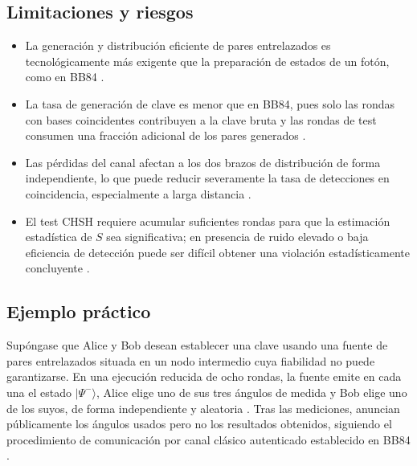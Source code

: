 \subsection{Limitaciones y riesgos}
\begin{itemize}
    \item La generación y distribución eficiente de pares entrelazados es tecnológicamente más exigente que la preparación de estados de un fotón, como en BB84 \citep{bennett1984,gisin2002}.
    \item La tasa de generación de clave es menor que en BB84, pues solo las rondas con bases coincidentes contribuyen a la clave bruta y las rondas de test consumen una fracción adicional de los pares generados \citep{ekert1991,scarani2009}.
    \item Las pérdidas del canal afectan a los dos brazos de distribución de forma independiente, lo que puede reducir severamente la tasa de detecciones en coincidencia, especialmente a larga distancia \citep{gisin2002,lo2014}.
    \item El test CHSH requiere acumular suficientes rondas para que la estimación estadística de $S$ sea significativa; en presencia de ruido elevado o baja eficiencia de detección puede ser difícil obtener una violación estadísticamente concluyente \citep{clauser1969,ekert1991,scarani2009}.
\end{itemize}

\subsection{Ejemplo práctico}

Supóngase que Alice y Bob desean establecer una clave usando una fuente de pares entrelazados situada en un nodo intermedio cuya fiabilidad no puede garantizarse. En una ejecución reducida de ocho rondas, la fuente emite en cada una el estado $|\Psi^-\rangle$, Alice elige uno de sus tres ángulos de medida y Bob elige uno de los suyos, de forma independiente y aleatoria \citep{ekert1991}. Tras las mediciones, anuncian públicamente los ángulos usados pero no los resultados obtenidos, siguiendo el procedimiento de comunicación por canal clásico autenticado establecido en BB84 \citep{bennett1984}.

